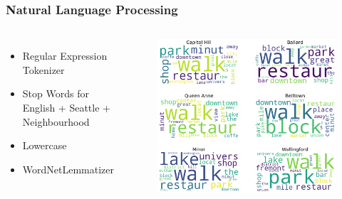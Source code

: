 \documentclass{beamer}
\begin{document}
\begin{frame}
\frametitle{Natural Language Processing}
\begin{columns}[c] %

\begin{itemize}
\item Regular Expression Tokenizer
\item Stop Words for English + Seattle + Neighbourhood
\item Lowercase
\item WordNetLemmatizer
\end{itemize}

\begin{figure}
\includegraphics[width=0.8\linewidth]{photo/13_wordclouds}
\end{figure}

\end{columns}
\end{frame}


\end{document}
